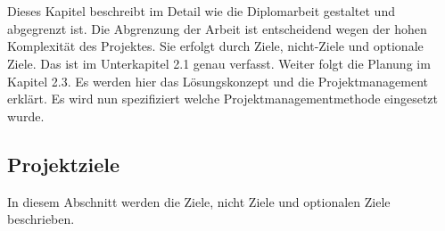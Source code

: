 \chapter{\docname}
\label{\docname}
Dieses Kapitel beschreibt im Detail wie die Diplomarbeit gestaltet und abgegrenzt ist. Die Abgrenzung der Arbeit ist entscheidend wegen der hohen Komplexität des Projektes. Sie erfolgt durch Ziele, nicht-Ziele und optionale Ziele. Das ist im Unterkapitel 2.1 genau verfasst. 
Weiter folgt die Planung im Kapitel 2.3. Es werden hier das Lösungskonzept und die Projektmanagement erklärt. Es wird nun spezifiziert welche Projektmanagementmethode eingesetzt wurde.
\section{Projektziele}
In diesem Abschnitt werden die Ziele, nicht Ziele und optionalen Ziele beschrieben.
